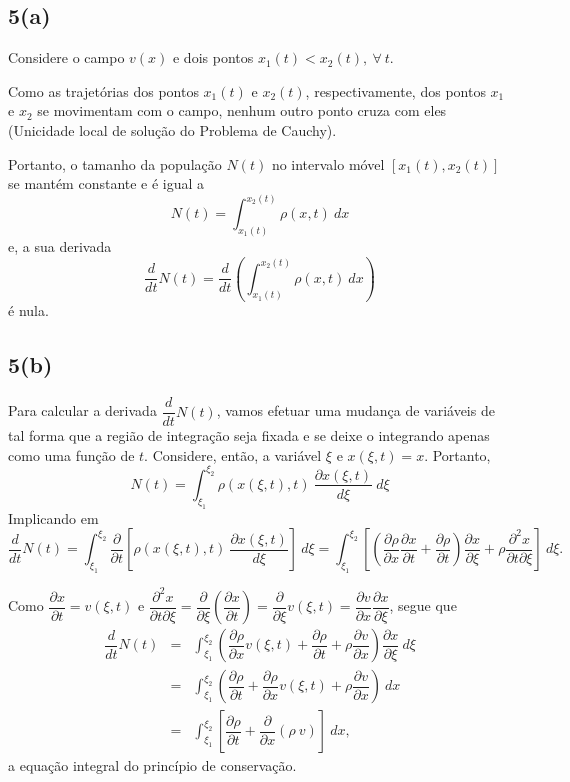
\subsection*{5(a)}

Considere o campo \(v(x)\) e dois pontos \(x_1(t) < x_2(t),\ \forall\ t\).

Como as trajetórias dos pontos \(x_1(t)\) e \(x_2(t)\), respectivamente, dos pontos \(x_1\) e \(x_2\) se movimentam com o campo, nenhum outro ponto cruza com eles (Unicidade local de solução do Problema de Cauchy).

Portanto, o tamanho da população \(N(t)\) no intervalo móvel \([x_1(t), x_2(t)]\) se mantém constante e é igual a
\[N(t) = \displaystyle\int_{x_1(t)}^{x_2(t)} \rho(x, t)\ dx\]
e, a sua derivada
\[\dfrac{d}{dt} N(t) = \dfrac{d}{dt} \left(\displaystyle\int_{x_1(t)}^{x_2(t)} \rho(x, t)\ dx\right)\]
é nula.



\subsection*{5(b)}

Para calcular a derivada \(\dfrac{d}{dt} N(t)\), vamos efetuar uma mudança de variáveis de tal forma que a região de integração seja fixada e se deixe o integrando apenas como uma função de \(t\). Considere, então, a variável \(\xi\) e \(x(\xi, t) = x\). Portanto,
\[N(t) = \displaystyle\int_{\xi_1}^{\xi_2} \rho(x(\xi,t), t)\ \dfrac{\partial x(\xi, t)}{d\xi} \ d\xi\]
Implicando em
\[\dfrac{d}{dt}N(t)
=
\displaystyle\int_{\xi_1}^{\xi_2} \dfrac{\partial}{\partial t}
\left[\rho(x(\xi,t), t)\ \dfrac{\partial x(\xi, t)}{d\xi}\right]\ d\xi
=
\displaystyle\int_{\xi_1}^{\xi_2} \left[\left(\dfrac{\partial \rho}{\partial x} \dfrac{\partial x}{\partial t} + \dfrac{\partial \rho}{\partial t}\right) \dfrac{\partial x}{\partial \xi} + \rho \dfrac{\partial^2 x}{\partial t \partial \xi}\right]\ d\xi.
\]

Como \(\dfrac{\partial x}{\partial t} = v(\xi, t)\) e \(\dfrac{\partial^2 x}{\partial t \partial \xi} = \dfrac{\partial}{\partial \xi}\left(\dfrac{\partial x}{\partial t}\right) = \dfrac{\partial}{\partial \xi} v(\xi,t) = \dfrac{\partial v}{\partial x} \dfrac{\partial x}{\partial \xi}\), segue que
\[\begin{array}{rcl}
\dfrac{d}{dt}N(t)
&=& 
\displaystyle\int_{\xi_1}^{\xi_2} \left(\dfrac{\partial \rho}{\partial x} v(\xi,t) + \dfrac{\partial \rho}{\partial t} + \rho \dfrac{\partial v}{\partial x} \right) \dfrac{\partial x}{\partial \xi}\ d\xi \\[0.5cm]
&=&
\displaystyle\int_{\xi_1}^{\xi_2} \left(\dfrac{\partial \rho}{\partial t} + \dfrac{\partial \rho}{\partial x} v(\xi,t) + \rho \dfrac{\partial v}{\partial x} \right)\ dx \\[0.5cm]
&=&
\displaystyle\int_{\xi_1}^{\xi_2} \left[\dfrac{\partial \rho}{\partial t} + \dfrac{\partial }{\partial x} (\rho\ v) \right]\ dx,
\end{array}\]
a equação integral do princípio de conservação.

